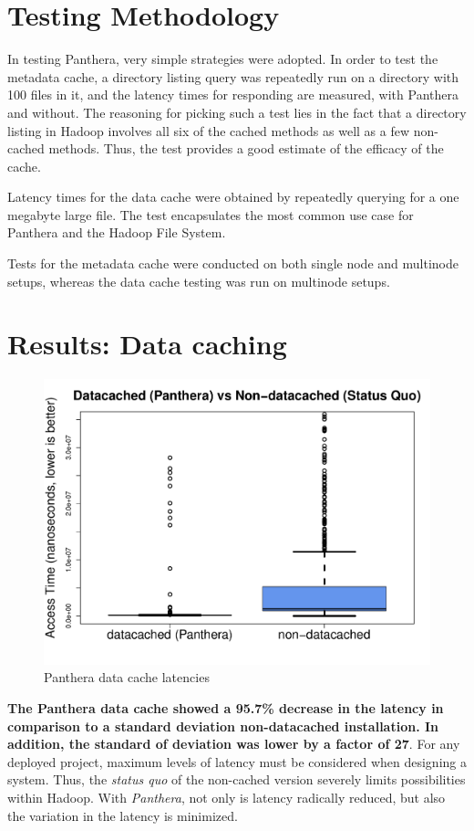 \documentclass[12pt]{article}
\begin{document}
\section{Testing Methodology}

In testing Panthera, very simple strategies were adopted. In order to test the metadata cache, a directory listing query was repeatedly run on a directory with 100 files in it, and the latency times for responding are measured, with Panthera and without. The reasoning for picking such a test lies in the fact that a directory listing in Hadoop involves all six of the cached methods as well as a few non-cached methods. Thus, the test provides a good estimate of the efficacy of the cache.

Latency times for the data cache were obtained by repeatedly querying for a one megabyte large file. The test encapsulates the most common use case for Panthera and the Hadoop File System.

Tests for the metadata cache were conducted on both single node and multinode setups, whereas the data cache testing was run on multinode setups.

\section{Results: Data caching}
\begin{figure}[!h]
	\caption{Panthera data cache latencies}
	\centering
		\includegraphics[scale=0.4]{assets/box-plot-data.pdf}
\end{figure}

\textbf{The Panthera data cache showed a 95.7\% decrease in the latency in comparison to a standard deviation non-datacached installation. In addition, the standard of deviation was lower by a factor of 27}. For any deployed project, maximum levels of latency must be considered when designing a system. Thus, the \textit{status quo} of the non-cached version severely limits possibilities within Hadoop. With \textit{Panthera}, not only is latency radically reduced, but also the variation in the latency is minimized.
\end{document}
